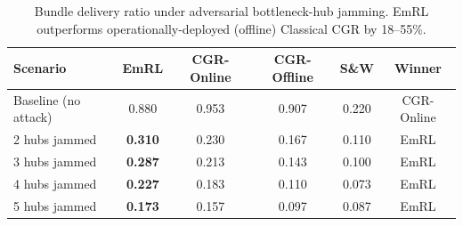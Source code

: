 \begin{table}[t]
\centering
\caption{Bundle delivery ratio under adversarial bottleneck-hub jamming. EmRL outperforms operationally-deployed (offline) Classical CGR by 18--55\%.}
\label{tab:jamming}
\begin{tabular}{lccccc}
\toprule
Scenario & EmRL & CGR-Online & CGR-Offline & S\&W & Winner \\
\midrule
Baseline (no attack) & 0.880 & 0.953 & 0.907 & 0.220 & CGR-Online \\
2 hubs jammed & \textbf{0.310} & 0.230 & 0.167 & 0.110 & EmRL \\
3 hubs jammed & \textbf{0.287} & 0.213 & 0.143 & 0.100 & EmRL \\
4 hubs jammed & \textbf{0.227} & 0.183 & 0.110 & 0.073 & EmRL \\
5 hubs jammed & \textbf{0.173} & 0.157 & 0.097 & 0.087 & EmRL \\
\bottomrule
\end{tabular}
\end{table}
